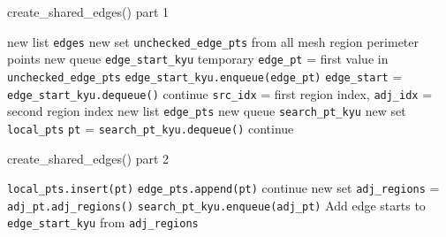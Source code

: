 \begin{algorithm}
	\caption{create\_shared\_edges() part 1}\label{alg:shared_edges}
\begin{algorithmic}[1]
	\State new list \texttt{edges} 
	\State new set \texttt{unchecked\_edge\_pts} from all mesh region perimeter points
	\State new queue \texttt{edge\_start\_kyu} 
		\State temporary \texttt{edge\_pt} = first value in \texttt{unchecked\_edge\_pts}
		\State \texttt{edge\_start\_kyu.enqueue(edge\_pt)}
		\State \texttt{edge\_start} = \texttt{edge\_start\_kyu.dequeue()}
				\State continue
			\EndIf
			\State \texttt{src\_idx} = first region index, \texttt{adj\_idx} = second region index
			\State new list \texttt{edge\_pts} 
			\State new queue \texttt{search\_pt\_kyu}
			\State new set \texttt{local\_pts}
				\State \texttt{pt} = \texttt{search\_pt\_kyu.dequeue()}
					\State continue
				\EndIf
\end{algorithmic}
\end{algorithm}
\begin{algorithm}
	\caption{create\_shared\_edges() part 2}
\begin{algorithmic}[1]
				\State \texttt{local\_pts.insert(pt)}
				\State \texttt{edge\_pts.append(pt)}
						\State continue
					\EndIf
					\State new set \texttt{adj\_regions} = \texttt{adj\_pt.adj\_regions()}
						\State \texttt{search\_pt\_kyu.enqueue(adj\_pt)}
					\EndIf
						\State Add edge starts to \texttt{edge\_start\_kyu} from \texttt{adj\_regions}
					\EndIf
				\EndFor
			\EndWhile
		\EndWhile
	\EndWhile
	\EndFunction
	\State {}
\end{algorithmic}
\end{algorithm}

